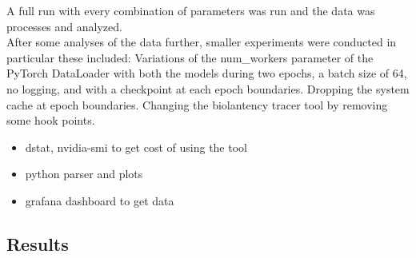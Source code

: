 \documentclass[conference]{IEEEtran}
\begin{document}
A full run with every combination of parameters was run and the data was processes and analyzed.\\
After some analyses of the data further, smaller experiments were conducted in particular these included:
Variations of the num\_workers parameter of the PyTorch DataLoader with both the models during two epochs, a batch size of 64, no logging, and with a checkpoint at each epoch boundaries.
Dropping the system cache at epoch boundaries.
Changing the biolantency tracer tool by removing some hook points.


\begin{itemize}
	\item dstat, nvidia-smi to get cost of using the tool
	\item python parser and plots
	\item grafana dashboard to get data
\end{itemize}

\subsection{Results}
\end{document}
